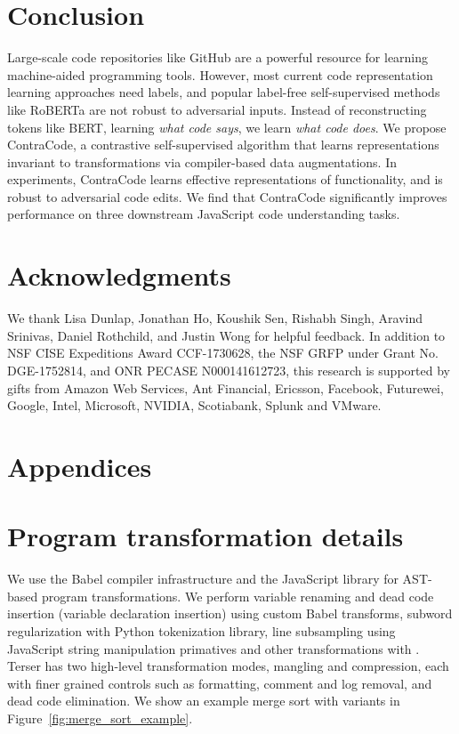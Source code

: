 \documentclass[11pt]{article}
\newcommand{\ours}[0]{ContraCode}
\begin{document}
\section{Conclusion}
Large-scale code repositories like GitHub are a powerful resource for learning machine-aided programming tools. However, most current code representation learning approaches need labels, and popular label-free self-supervised methods like RoBERTa are not robust to adversarial inputs.
Instead of reconstructing tokens like BERT, learning \textit{what code says}, we learn \textit{what code does}. We propose \ours{}, a contrastive self-supervised algorithm that learns representations invariant to transformations via compiler-based data augmentations. In experiments, \ours{} learns effective representations of functionality, and is robust to adversarial code edits. We find that \ours{} significantly improves performance on three downstream JavaScript code understanding tasks.

\section*{Acknowledgments}
 We thank Lisa Dunlap, Jonathan Ho, Koushik Sen, Rishabh Singh, Aravind Srinivas, Daniel Rothchild, and Justin Wong for helpful feedback.
In addition to NSF CISE Expeditions Award CCF-1730628, the NSF GRFP under Grant No. DGE-1752814, and ONR PECASE N000141612723, this research is supported by gifts from Amazon Web Services, Ant Financial, Ericsson, Facebook, Futurewei, Google, Intel, Microsoft, NVIDIA, Scotiabank, Splunk and VMware.




\clearpage

\appendix
\section*{Appendices}
\section{Program transformation details}
\label{sec:appendix:program_transformations}
We use the Babel compiler infrastructure \citep{babel_github} and the  JavaScript library for AST-based program transformations. We perform variable renaming and dead code insertion (variable declaration insertion) using custom Babel transforms, subword regularization with  Python tokenization library, line subsampling using JavaScript string manipulation primatives and other transformations with . Terser has two high-level transformation modes, mangling and compression, each with finer grained controls such as formatting, comment and log removal, and dead code elimination. We show an example merge sort with variants in Figure~\ref{fig:merge_sort_example}.
\end{document}
